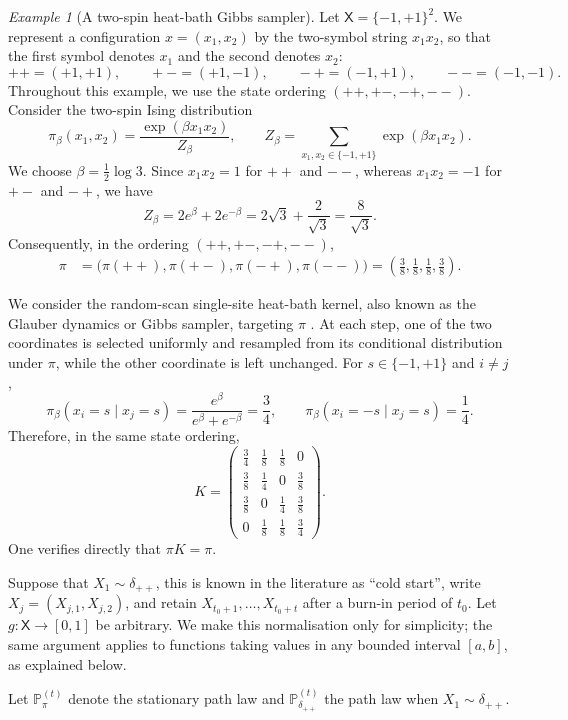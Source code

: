 \documentclass[11pt]{article}
\theoremstyle{plain}
\theoremstyle{remark}
\newtheorem{example}{Example}
\begin{document}
\begin{example}[A two-spin heat-bath Gibbs sampler]
\label{ex:twoSpinGibbs}
Let \(\mathsf X=\{-1,+1\}^2\). We represent a configuration
\(x=(x_1,x_2)\) by the two-symbol string \(x_1x_2\), so that the first
symbol denotes \(x_1\) and the second denotes \(x_2\):
\[
++=(+1,+1),\qquad
+-=(+1,-1),\qquad
-+=(-1,+1),\qquad
--=(-1,-1).
\]
Throughout this example, we use the state ordering $
(++,+-,-+,--).$ Consider the two-spin Ising distribution
\[
\pi_\beta(x_1,x_2)
=
\frac{\exp(\beta x_1x_2)}{Z_\beta},
\qquad
Z_\beta
=
\sum_{x_1,x_2\in\{-1,+1\}}
\exp(\beta x_1x_2).
\]
We choose \(\beta=\frac12\log 3\). Since \(x_1x_2=1\) for \(++\)
and \(--\), whereas \(x_1x_2=-1\) for \(+-\) and \(-+\), we have
\[
Z_\beta
=
2e^\beta+2e^{-\beta}
=
2\sqrt 3+\frac{2}{\sqrt 3}
=
\frac{8}{\sqrt 3}.
\]
Consequently, in the ordering \((++,+-,-+,--)\),
\[
\begin{split}
\pi
&=
\bigl(\pi(++),\pi(+-),\pi(-+),\pi(--)\bigr)=
\left(\frac38,\frac18,\frac18,\frac38\right).
\end{split}
\]

We consider the random-scan single-site heat-bath kernel, also known
as the Glauber dynamics or Gibbs sampler, targeting \(\pi\)
\cite[Sec.~3.3]{levinPeres2017}. At each step, one of the two
coordinates is selected uniformly and resampled from its conditional
distribution under \(\pi\), while the other coordinate is left
unchanged. For \(s\in\{-1,+1\}\) and \(i\neq j\),
\[
\pi_\beta(x_i=s\mid x_j=s)
=
\frac{e^\beta}{e^\beta+e^{-\beta}}
=
\frac34,
\qquad
\pi_\beta(x_i=-s\mid x_j=s)
=
\frac14.
\]
Therefore, in the same state ordering,
\[
K=
\begin{pmatrix}
 \frac34 & \frac18 & \frac18 & 0\\
 \frac38 & \frac14 & 0        & \frac38\\
 \frac38 & 0        & \frac14 & \frac38\\
 0        & \frac18 & \frac18 & \frac34
\end{pmatrix}.
\]
One verifies directly that \(\pi K=\pi\).

Suppose that \(X_1\sim\delta_{++}\), this is known in the literature as   ``cold start'', write
\(X_j=(X_{j,1},X_{j,2})\), and retain $X_{t_0+1},\ldots,X_{t_0+t}$ 
after a burn-in period of \(t_0\). Let \(g:\mathsf X\to[0,1]\) be arbitrary. We make this
normalisation only for simplicity; the same argument applies to
functions taking values in any bounded interval \([a,b]\), as
explained below.

Let \(\mathbb P_{\pi}^{(t)}\) denote the stationary path law and \(\mathbb P_{\delta_{++}}^{(t)}\) the path law when $X_1\sim \delta_{++}$.


\end{example}
\end{document}
